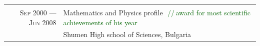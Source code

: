\documentclass[a4paper,10pt]{article}
\def\myline{\color{linegray}\vline}
\newcommand{\minorcolor}[1]{\textcolor{mygray}{#1}}
\newcommand{\comment}[1]{\small\textcolor{darkgreen}{\,\,//\,#1}}
\newcommand{\mydate}[1]{\minorcolor{\textsc{#1}}}
\begin{document}
\begin{tabular}{r!{\myline}p{14cm}}
        \\
        \mydate{Sep 2000 --- Jun 2008}      &   Mathematics and Physics profile
                                                \comment{award for most scientific achievements of his year}\\
                                            &   Shumen High school of Sciences, Bulgaria\\
\end{tabular}
\par\smallskip

%
%
\end{document}
